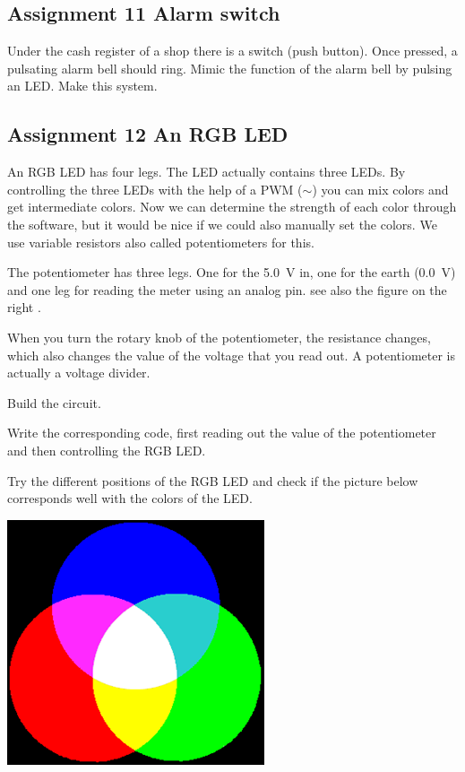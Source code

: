 \documentclass{arduino}
\begin{document}
\subsection{Assignment 11 Alarm switch}

Under the cash register of a shop there is a switch (push button). Once pressed, a pulsating alarm bell should ring. Mimic the function of the alarm bell by pulsing an LED. Make this system.

\newpage
\subsection{Assignment 12 An RGB LED}


An RGB LED has four legs. The LED actually contains three LEDs. By controlling the three LEDs with the help of a PWM ($\sim$) you can mix colors and get intermediate colors. Now we can determine the strength of each color through the software, but it would be nice if we could also manually set the colors. We use variable resistors also called potentiometers for this.

The potentiometer has three legs. One for the \SI{5.0}{\volt} in, one for the earth (\SI{0.0}{\volt}) and one leg for reading the meter using an analog pin. see also the figure on the right .

When you turn the rotary knob of the potentiometer, the resistance changes, which also changes the value of the voltage that you read out. A potentiometer is actually a voltage divider.

\begin{alphalist}
\item Build the circuit.

\item Write the corresponding code, first reading out the value of the potentiometer and then controlling the RGB LED.

\item Try the different positions of the RGB LED and check if the picture below corresponds well with the colors of the LED.
\end{alphalist}

\begin{center}
\includegraphics[width=0.5\linewidth]{26. Mixing colours}
\end{center}
\end{document}
